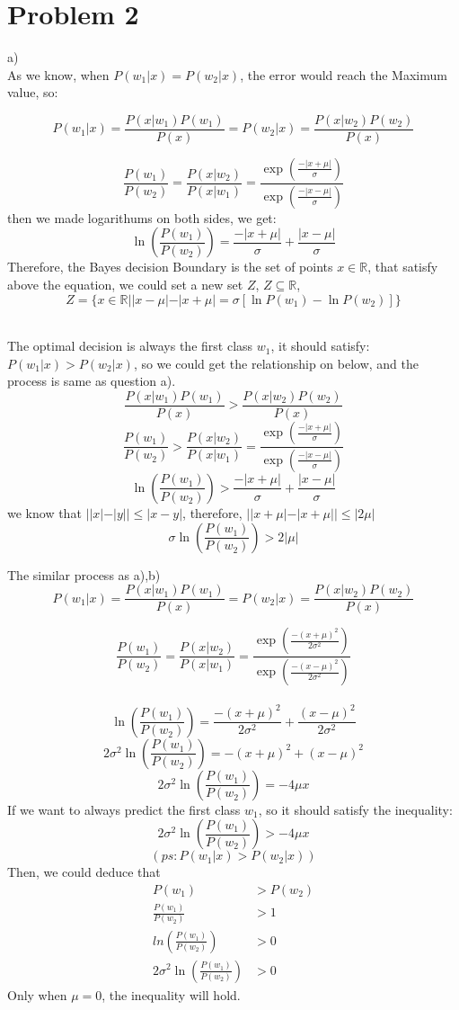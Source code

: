 \documentclass{article}
\newcommand{\R}{\mathbb{R}}
\begin{document}
\cleardoublepage
\section{Problem 2}
a)\\
As we know, when $P(w_{1}|x) = P(w_{2}|x)$, the error would reach the Maximum value, so:

$$P(w_{1}|x) = \frac{P(x|w_{1})P(w_{1})}{P(x)} = P(w_{2}|x) =  \frac{P(x|w_{2})P(w_{2})}{P(x)}$$

$$\frac{P(w_{1})}{P(w_{2})} = \frac{P(x|w_{2})}{P(x|w_{1})} = \frac{\exp{(\frac{-|x + \mu|}{\sigma})}}{\exp{(\frac{-|x - \mu|}{\sigma})}}$$ 
then we made logarithums on both sides, we get:
$$\ln{\left(\frac{P(w_{1})}{P(w_{2})}\right)} = \frac{-|x + \mu|}{\sigma} + \frac{|x - \mu|}{\sigma} $$
Therefore, the Bayes decision Boundary is the set of points $x \in \R$, that satisfy above the equation, we could set a new set $Z$, $Z \subseteq \R $,
$$ Z = {\{ x \in \R ||x - \mu|-|x + \mu| = \sigma{[\ln{P(w_{1})} - \ln{P(w_{2})}]}\} }$$\\






The optimal decision is always the first class $w_{1}$, it should satisfy: 
$ P(w_{1}|x) >P(w_{2}|x)$, so we could get the relationship on below,  and the process is same as question a).
$$\frac{P(x|w_{1})P(w_{1})}{P(x)} > \frac{P(x|w_{2})P(w_{2})}{P(x)}$$
$$\frac{P(w_{1})}{P(w_{2})} >\frac{P(x|w_{2})}{P(x|w_{1})} = \frac{\exp{(\frac{-|x + \mu|}{\sigma})}}{\exp{(\frac{-|x - \mu|}{\sigma})}}$$ 
$$\ln{\left(\frac{P(w_{1})}{P(w_{2})}\right)} > \frac{-|x + \mu|}{\sigma} + \frac{|x - \mu|}{\sigma} $$
we know that $||x|-|y||\leq |x-y|$, therefore, $||x + \mu|-|x + \mu||\leq |2\mu| $ 
$$\sigma{\ln{\left(\frac{P(w_{1})}{P(w_{2})}\right)}} > 2|\mu| $$


The similar process as a),b)
$$P(w_{1}|x) = \frac{P(x|w_{1})P(w_{1})}{P(x)} = P(w_{2}|x) =  \frac{P(x|w_{2})P(w_{2})}{P(x)}$$

$$\frac{P(w_{1})}{P(w_{2})} = \frac{P(x|w_{2})}{P(x|w_{1})} = \frac{\exp{(\frac{-(x + \mu)^2}{2\sigma^2})}}{\exp{(\frac{-(x - \mu)^2}{2\sigma^2})}}$$ \\

$$\ln{\left(\frac{P(w_{1})}{P(w_{2})}\right)} = \frac{-(x + \mu)^2}{2\sigma^2} + \frac{(x - \mu)^2}{2\sigma^2} $$
$$2\sigma^2\ln{\left(\frac{P(w_{1})}{P(w_{2})}\right)} = -(x + \mu)^2 + (x - \mu)^2 $$
$$2\sigma^2\ln{\left(\frac{P(w_{1})}{P(w_{2})}\right)}  = -4\mu x$$
If we want to always predict the first class $w_{1}$, so it should satisfy the inequality: 
$$2\sigma^2\ln{\left(\frac{P(w_{1})}{P(w_{2})}\right)}  > -4\mu x$$
$$(ps:P(w_{1}|x) >P(w_{2}|x) )$$
Then, we could deduce that 
\begin{align*}
P(w_{1})&>P(w_{2}) \\
\frac{P(w_{1})}{P(w_{2})}&>1\\
ln{\left(\frac{P(w_{1})}{P(w_{2})}\right)}& > 0\\
2\sigma^2\ln{\left(\frac{P(w_{1})}{P(w_{2})}\right)} &>0
\end{align*}
Only when $\mu = 0$, the inequality will hold.
\end{document}
